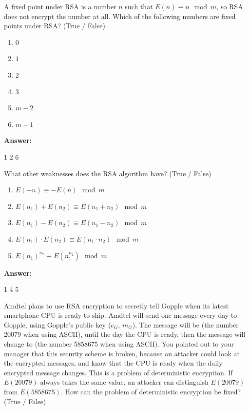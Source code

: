 \documentclass[12pt,twoside]{article}
\newcommand{\answer}{
 \par\medskip
 \textbf{Answer:}
}
\newcommand{\answerIId}{ \answer
1 2 6
}
\newcommand{\answerIIe}{ \answer
1 4 5
}
\begin{document}
\begin{problems}
\begin {problemparts}
\problempart {} A fixed point under RSA is a number $n$ such that $E(n)
\equiv n \mod m$, so RSA does not encrypt the number at all. Which of the
following numbers are fixed points under RSA? (True / False)
\begin{enumerate}
  \item $0$
  \item $1$
  \item $2$
  \item $3$
  \item $m - 2$
  \item $m - 1$
\end{enumerate}
\answerIId
  
\problempart {} What other weaknesses does the RSA algorithm have?
(True / False)
\begin{enumerate}
  \item $E(-n) \equiv -E(n) \mod m$
  \item $E(n_1) + E(n_2) \equiv E(n_1 + n_2) \mod m$
  \item $E(n_1) - E(n_2) \equiv E(n_1 - n_2) \mod m$
  \item $E(n_1) \cdot E(n_2) \equiv E(n_1 \cdot n_2) \mod m$
  \item $E(n_1)^{n_2} \equiv E(n_1 ^ {n_2}) \mod m$
\end{enumerate}
\answerIIe

\problempart {} Amdtel plans to use RSA encryption to secretly tell
Gopple when its latest smartphone CPU is ready to ship. Amdtel will send one
message every day to Gopple, using Gopple's public key ($e_G$, $m_G$). The
message will be  (the number 20079 when using ASCII), until the day
the CPU is ready, then the message will change to  (the number
5858675 when using ASCII). You pointed out to your manager that this security
scheme is broken, because an attacker could look at the encrypted messages, and
know that the CPU is ready when the daily encrypted message changes. This is a
problem of deterministic encryption. If $E(20079)$ always takes the same value,
an attacker can distinguish $E(20079)$ from $E(5858675)$. How can the problem of
deterministic encryption be fixed? (True / False)


\end{problemparts}
\end{problems}
\end{document}
